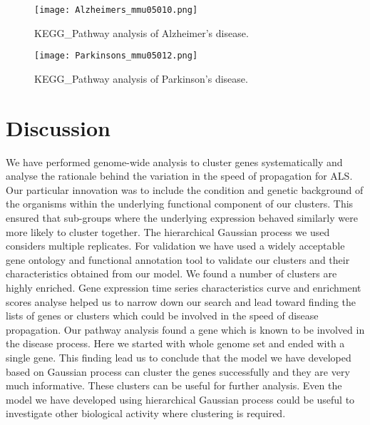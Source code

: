 \begin{figure}
 \begin{center}
 \texttt{[image: Alzheimers\_mmu05010.png]}
\caption {KEGG\_Pathway analysis of Alzheimer's disease. \label{AlzheimerPathwayAnalysis}}
 \end{center}
\end{figure}


\begin{figure}
 \begin{center}
 \texttt{[image: Parkinsons\_mmu05012.png]}
\caption {KEGG\_Pathway analysis of Parkinson's disease. \label{ParkinsonPathwayAnalysis}}
 \end{center}
\end{figure}


\section{Discussion}
We have performed genome-wide analysis to cluster genes systematically and analyse the rationale behind the variation in the speed of propagation for ALS. Our particular innovation was to include the condition and genetic background of the organisms within the underlying functional component of our clusters. This ensured that sub-groups where the underlying expression behaved similarly were more likely to cluster together. The hierarchical Gaussian process we used considers multiple replicates. For validation we have used a widely acceptable gene ontology and functional annotation tool to validate our clusters and their characteristics obtained from our model. We found a number of clusters are highly enriched. Gene expression time series characteristics curve and enrichment scores analyse helped us to narrow down our search and lead toward finding the lists of genes or clusters which could be involved in the speed of disease propagation. Our pathway analysis found a gene which is known to be
involved in the disease process. Here we started with whole genome set and ended with a single gene. This finding lead us to conclude that the model we have developed based on Gaussian process can cluster the genes successfully and they are very much informative. These clusters can be useful for further analysis.  Even the model we have developed using hierarchical Gaussian process could be useful to investigate other biological activity where clustering is required. 
